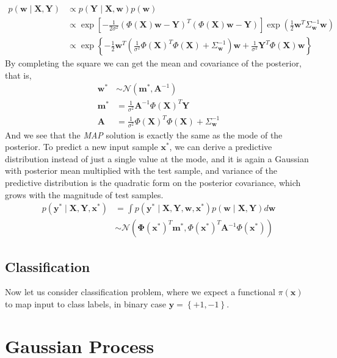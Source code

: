 \documentclass{article}
\newcommand{\vct}[1]{\ensuremath{\boldsymbol{#1}}} %
\newcommand{\set}[1]{\ensuremath{\mathcal{#1}}}
\begin{document}
\begin{align}
p\left( \vct w \mid \vct X, \vct Y \right) & \propto p\left( \vct Y \mid \vct X, \vct w \right)p\left( \vct w \right)  \nonumber\\
& \propto \exp \left\lbrack -\frac{1}{2\sigma^2}\left( \Phi(\vct X)\vct w - \vct Y\right)^T\left( \Phi(\vct X)\vct w - \vct Y\right) \right\rbrack \exp \left( \frac{1}{2}\vct w^T\Sigma_{\vct w}^{-1}\vct w \right)  \nonumber\\
& \propto \exp\left\{ -\frac{1}{2}\vct w^T\left( \frac{1}{\sigma^2}\Phi(\vct X)^T \Phi(\vct X) + \Sigma_{\vct w}^{-1}\right)\vct w + \frac{1}{\sigma^2}\vct Y^T\Phi(\vct X)\vct w \right\}
\end{align}
By completing the square we can get the mean and covariance of the posterior, that is, 
\begin{align}
 \vct w^* &\sim\set N \left( \vct m^*,  \vct A^{-1} \right) \nonumber \\
 \vct m^* &= \frac{1}{\sigma^2} \vct A^{-1} \Phi(\vct X)^T\vct Y \\
  \vct A  &= \frac{1}{\sigma^2}\Phi(\vct X)^T\Phi(\vct X)+\Sigma_{\vct w}^{-1}
\end{align}
And we see that the \textit{MAP} solution is exactly the same as the mode of the posterior. To predict a new input sample $ \vct x^* $, we can derive a predictive distribution instead of just a single value at the mode, and it is again a Gaussian with posterior mean multiplied with the test sample, and variance of the predictive distribution is the quadratic form on the posterior covariance, which grows with the magnitude of test samples. 
\begin{align} 
	p(\vct y^* \mid \vct X, \vct Y, \vct x^*) & = \int p(\vct y^*\mid \vct X, \vct Y, \vct w, \vct x^*)p(\vct w \mid \vct X, \vct Y)d\vct w  \nonumber \\
	& \sim \set N\left( \vct \Phi(\vct x^*)^T \vct m^*, \Phi(\vct x^*)^T \vct A^{-1} \Phi(\vct x^*) \right)
\end{align}


\subsection{Classification}
Now let us consider classification problem, where we expect a functional $ \pi(\vct x) $ to map input to class labels, in binary case $ \vct y=\left\{ +1, -1 \right\} $. 

\section{Gaussian Process}
\end{document}
